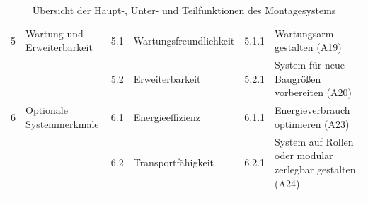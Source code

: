 {\begin{longtable}{|p{0.5cm}|p{2.5cm}|p{0.6cm}|p{3.5cm}|p{0.8cm}|p{5.0cm}|}
5 & Wartung und Erweiterbarkeit & 5.1 & Wartungsfreundlichkeit &
5.1.1 & Wartungsarm gestalten (A19) \\
\cline{3-6}
  &  & 5.2 & Erweiterbarkeit &
5.2.1 & System für neue Baugrößen vorbereiten (A20) \\
\hline

6 & Optionale Systemmerkmale & 6.1 & Energieeffizienz &
6.1.1 & Energieverbrauch optimieren (A23) \\
\cline{3-6}
  &  & 6.2 & Transportfähigkeit &
6.2.1 & System auf Rollen oder modular zerlegbar gestalten (A24) \\
\hline

\caption{Übersicht der Haupt-, Unter- und Teilfunktionen des Montagesystems}
\label{tab:teilfunktionen}
\end{longtable}
}

